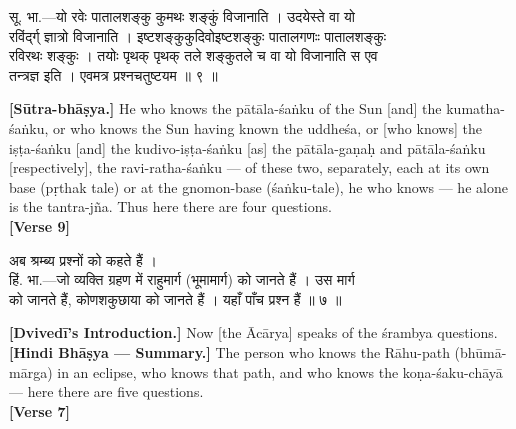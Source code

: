 \documentclass[11pt,a4paper]{article}
\newcommand{\dev}[1]{{\devanagarifont #1}}
\newcommand{\bilingualpair}[2]{%
  \noindent%
  \begin{minipage}[t]{0.48\textwidth}
    #1%
  \end{minipage}%
  \hfill%
  \begin{minipage}[t]{0.48\textwidth}
    #2%
  \end{minipage}%
  \par\vspace{0.5em}%
}
\newenvironment{sanskritcol}{\devanagarifont\small}{}
\newenvironment{englishcol}{\iastfont\small}{}
\begin{document}
\vspace{0.3cm}
\bilingualpair{%
\begin{sanskritcol}
\dev{सू. भा.---यो रवेः पातालशङ्कु कुमथः शङ्कुं विजानाति । उदयेस्ते वा यो}\\[0.3em]
\dev{रविंद्‌र्ग् ज्ञात्रो विजानाति । इष्टशङ्कुकुदिवोइष्टशङ्कुः पातालगणःः पातालशङ्कुः}\\[0.3em]
\dev{रविरथः शङ्कुः । तयोः पृथक् पृथक् तले शङ्कुतले च वा यो विजानाति स एव}\\[0.3em]
\dev{तन्त्रज्ञ इति । एवमत्र प्रश्नचतुष्टयम ॥ ९ ॥}
\end{sanskritcol}%
}{%
\begin{englishcol}
\textbf{[Sūtra-bhāṣya.]} He who knows the pātāla-\'saṅku of the Sun [and] the kumatha-\'saṅku, or who knows the Sun having known the uddheśa, or [who knows] the iṣṭa-\'saṅku [and] the kudivo-iṣṭa-\'saṅku [as] the pātāla-gaṇaḥ and pātāla-\'saṅku [respectively], the ravi-ratha-\'saṅku --- of these two, separately, each at its own base (pṛthak tale) or at the gnomon-\-base (\'saṅku-tale), he who knows --- he alone is the tantra-jña. Thus here there are four questions.\\[0.3em]
\hfill \textbf{[Verse 9]}
\end{englishcol}%
}

\vspace{0.5cm}
\bilingualpair{%
\begin{sanskritcol}
\dev{अब श्रम्ब्य प्रश्नों को कहते हैं ।}\\[0.3em]
\dev{हिं. भा.---जो व्यक्ति ग्रहण में राहुमार्ग (भूमामार्ग) को जानते हैं । उस मार्ग}\\[0.3em]
\dev{को जानते हैं, कोणशकुछाया को जानते हैं । यहाँ पाँच प्रश्न हैं ॥ ७ ॥}
\end{sanskritcol}%
}{%
\begin{englishcol}
\textbf{[Dvivedī's Introduction.]} Now [the Ācārya] speaks of the \'srambya questions.\\[0.3em]
\textbf{[Hindi Bhāṣya --- Summary.]} The person who knows the Rāhu-path (bhūmā-mārga) in an eclipse, who knows that path, and who knows the koṇa-\'saku-chāyā --- here there are five questions.\\[0.3em]
\hfill \textbf{[Verse 7]}
\end{englishcol}%
}
\end{document}
